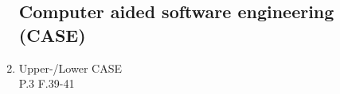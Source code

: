 \documentclass[10pt,a4paper,fleqn]{article}
\begin{document}
\begin{enumerate}
\subsection{Computer aided software engineering (CASE)}
	\item Upper-/Lower CASE\\
	P.3 F.39-41
%		
%
%		
%
\end{enumerate}
%
%
\end{document}
